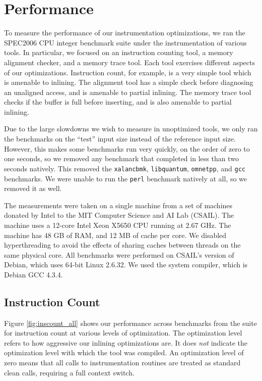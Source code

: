 \chapter{Performance}
\label{sec:performance}

To measure the performance of our instrumentation optimizations, we ran the
SPEC2006 CPU integer benchmark suite under the instrumentation of various tools.
In particular, we focused on an instruction counting tool, a memory alignment
checker, and a memory trace tool.  Each tool exercises different aspects of our
optimizations.  Instruction count, for example, is a very simple tool which is
amenable to inlining.  The alignment tool has a simple check before diagnosing
an unaligned access, and is amenable to partial inlining.  The memory trace tool
checks if the buffer is full before inserting, and is also amenable to partial
inlining.

Due to the large slowdowns we wish to measure in unoptimized tools, we only ran
the benchmarks on the ``test'' input size instead of the reference input size.
However, this makes some benchmarks run very quickly, on the order of zero to
one seconds, so we removed any benchmark that completed in less than two seconds
natively.  This removed the {\tt xalancbmk}, {\tt libquantum}, {\tt omnetpp},
and {\tt gcc} benchmarks.  We were unable to run the {\tt perl} benchmark
natively at all, so we removed it as well.

The measurements were taken on a single machine from a set of machines donated
by Intel to the MIT Computer Science and AI Lab (CSAIL).  The machine uses a
12-core Intel Xeon X5650 CPU running at 2.67 GHz.  The machine has 48 GB of RAM,
and 12 MB of cache per core.  We disabled hyperthreading to avoid the effects of
sharing caches between threads on the same physical core.  All benchmarks were
performed on CSAIL's version of Debian, which uses 64-bit Linux 2.6.32.  We used
the system compiler, which is Debian GCC 4.3.4.

\section{Instruction Count}

Figure \ref{fig:inscount_all} shows our performance across benchmarks from the
suite for instruction count at various levels of optimization.  The optimization
level refers to how aggressive our inlining optimizations are.  It does {\em not}
indicate the optimization level with which the tool was compiled.  An
optimization level of zero means that all calls to instrumentation routines are
treated as standard clean calls, requiring a full context switch.

